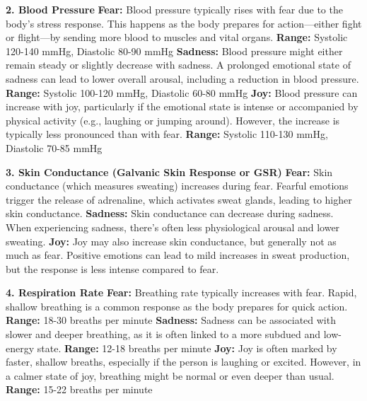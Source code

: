 \documentclass[12pt, research paper]{report}
\begin{document}
	\noindent \textbf{2. Blood Pressure}
	\newline \textbf{Fear:} Blood pressure typically rises with fear due to the body's stress response. This happens as the body prepares for action—either fight or flight—by sending more blood to muscles and vital organs.
	\newline \textbf{Range:} Systolic 120-140 mmHg, Diastolic 80-90 mmHg
	\newline \textbf{Sadness:} Blood pressure might either remain steady or slightly decrease with sadness. A prolonged emotional state of sadness can lead to lower overall arousal, including a reduction in blood pressure.
	\newline \textbf{Range:} Systolic 100-120 mmHg, Diastolic 60-80 mmHg
	\newline \textbf{Joy:} Blood pressure can increase with joy, particularly if the emotional state is intense or accompanied by physical activity (e.g., laughing or jumping around). However, the increase is typically less pronounced than with fear.
	\newline \textbf{Range:} Systolic 110-130 mmHg, Diastolic 70-85 mmHg
	\bigskip 
	
	\noindent \textbf{3. Skin Conductance (Galvanic Skin Response or GSR)}
	\newline \textbf{Fear:} Skin conductance (which measures sweating) increases during fear. Fearful emotions trigger the release of adrenaline, which activates sweat glands, leading to higher skin conductance.
	\newline \textbf{Sadness:} Skin conductance can decrease during sadness. When experiencing sadness, there's often less physiological arousal and lower sweating.
	\newline \textbf{Joy:} Joy may also increase skin conductance, but generally not as much as fear. Positive emotions can lead to mild increases in sweat production, but the response is less intense compared to fear.
	\bigskip
	
	\noindent \textbf{4. Respiration Rate}
	\newline \textbf{Fear:} Breathing rate typically increases with fear. Rapid, shallow breathing is a common response as the body prepares for quick action.
	\newline \textbf{Range:} 18-30 breaths per minute
	\newline \textbf{Sadness:} Sadness can be associated with slower and deeper breathing, as it is often linked to a more subdued and low-energy state.
	\newline \textbf{Range:} 12-18 breaths per minute
	\newline \textbf{Joy:} Joy is often marked by faster, shallow breaths, especially if the person is laughing or excited. However, in a calmer state of joy, breathing might be normal or even deeper than usual.
	\newline \textbf{Range:} 15-22 breaths per minute
	\bigskip 
	
\end{document}
